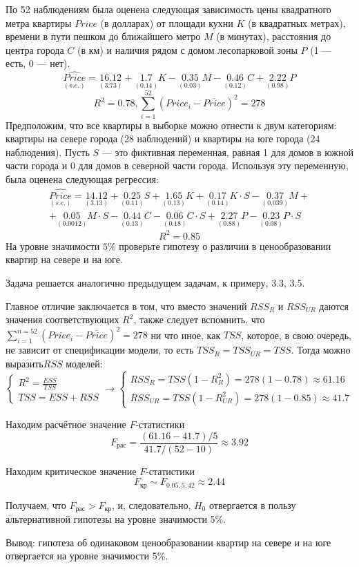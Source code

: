 \documentclass[pdftex,11pt,openany]{book}\usepackage[]{graphicx}\usepackage[]{color}
\begin{document}
\begin{problem} %
 По 52 наблюдениям была оценена следующая зависимость цены квадратного метра квартиры $Price$ (в долларах) от площади кухни $K$ (в квадратных метрах), времени в пути пешком до ближайшего метро $M$ (в минутах), расстояния до центра города $C$ (в км) и наличия рядом с домом лесопарковой зоны $P$ (1 --- есть, 0 --- нет).
\[
\underset{(s.e.)}{\widehat{Price}}=\underset{(3.73)}{16.12}+\underset{(0.14)}{1.7}K-\underset{(0.03)}{0.35}M-\underset{(0.12)}{0.46}C+\underset{(0.98)}{2.22}P
\]
\[
R^2=0.78, \sum_{i=1}^{52} {(Price_i-\overline{Price})^2}=278
\]
Предположим, что все квартиры в выборке можно отнести к двум категориям: квартиры на севере города (28 наблюдений) и квартиры на юге города (24 наблюдения). Пусть
$S$ --- это фиктивная переменная, равная 1 для домов в южной части города и 0 для домов в северной части города. Используя эту переменную, была оценена следующая регрессия:
\begin{multline}
\underset{(s.e.)}{\widehat{Price}} =\underset{(3.13)}{14.12}+\underset{(0.11)}{0.25}S+\underset{(0.13)}{1.65}K+\underset{(0.14)}{0.17}K\cdot{S}-\underset{(0.039)}{0.37}M+\\
+\underset{(0.0012)}{0.05}M\cdot{S}-\underset{(0.13)}{0.44}C-\underset{(0.18)}{0.06}C\cdot{S}+\underset{(0.88)}{2.27}P-\underset{(0.08)}{0.23}P\cdot{S}
\end{multline}
\[
R^2 = 0.85
\]
На уровне значимости $5\%$ проверьте гипотезу о различии в ценообразовании квартир на севере и на юге.
\end{problem}

\begin{solution}
Задача решается аналогично предыдущем задачам, к примеру, 3.3, 3.5. 

Главное отличие заключается в том, что вместо значений $RSS_{R}$ и $RSS_{UR}$ даются значения соответствующих $R^2$, также следует вспомнить, что $\sum_{i=1}^{n=52}(Price_i-\overline{Price})^2=278$ ни что иное, как $TSS$, которое, в свою очередь, не зависит от спецификации модели, то есть $TSS_R=TSS_{UR}=TSS$. Тогда можно выразить$RSS$ моделей:
\[
\begin{cases}
R^2=\frac{ESS}{TSS} \\
TSS=ESS+RSS
\end{cases}
\to
\begin{cases}
RSS_R=TSS(1-R^2_R)=278(1-0.78)\approx 61.16\\ 
RSS_{UR}=TSS(1-R^2_{UR})=278(1-0.85)\approx 41.7
\end{cases} 
\]

Находим расчётное значение $F$-статистики
\[
F_{\text{рас}}=\frac{(61.16-41.7)/5}{41.7/(52-10)}\approx 3.92
\]

Находим критическое значение $F$-статистики
\[
F_{\text{кр}}\sim F_{0.05,5,42}\approx 2.44
\]

Получаем, что $F_{\text{рас}}>F_{\text{кр}}$, и, следовательно, $H_0$ отвергается в пользу альтернативной гипотезы на уровне значимости 5\%.


Вывод: гипотеза об одинаковом ценообразовании квартир на севере и на юге отвергается на уровне значимости 5\%.
\end{solution}
\end{document}
